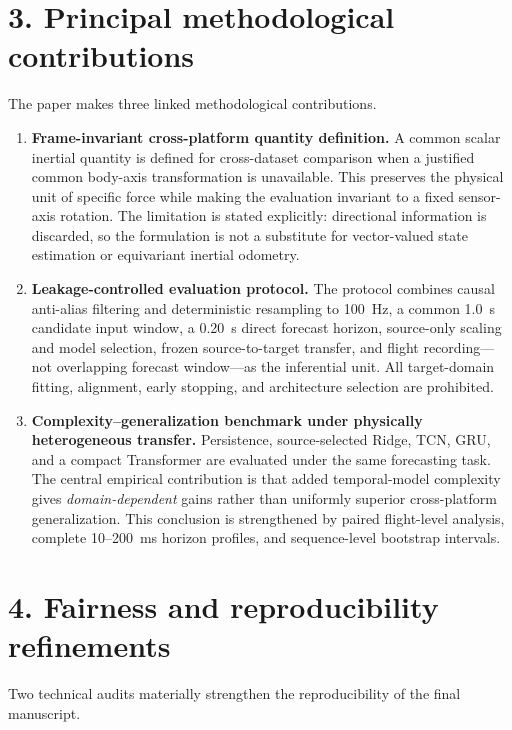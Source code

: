 \documentclass[12pt,a4paper]{article}
\begin{document}
\section*{3. Principal methodological contributions}

The paper makes three linked methodological contributions.

\begin{enumerate}[leftmargin=*]
    \item \textbf{Frame-invariant cross-platform quantity definition.}
    A common scalar inertial quantity is defined for cross-dataset comparison when a justified common body-axis transformation is unavailable. This preserves the physical unit of specific force while making the evaluation invariant to a fixed sensor-axis rotation. The limitation is stated explicitly: directional information is discarded, so the formulation is not a substitute for vector-valued state estimation or equivariant inertial odometry.

    \item \textbf{Leakage-controlled evaluation protocol.}
    The protocol combines causal anti-alias filtering and deterministic resampling to \SI{100}{\hertz}, a common \SI{1.0}{\second} candidate input window, a \SI{0.20}{\second} direct forecast horizon, source-only scaling and model selection, frozen source-to-target transfer, and flight recording---not overlapping forecast window---as the inferential unit. All target-domain fitting, alignment, early stopping, and architecture selection are prohibited.

    \item \textbf{Complexity--generalization benchmark under physically heterogeneous transfer.}
    Persistence, source-selected Ridge, TCN, GRU, and a compact Transformer are evaluated under the same forecasting task. The central empirical contribution is that added temporal-model complexity gives \emph{domain-dependent} gains rather than uniformly superior cross-platform generalization. This conclusion is strengthened by paired flight-level analysis, complete 10--200~ms horizon profiles, and sequence-level bootstrap intervals.
\end{enumerate}

\section*{4. Fairness and reproducibility refinements}

Two technical audits materially strengthen the reproducibility of the final manuscript.
\end{document}
